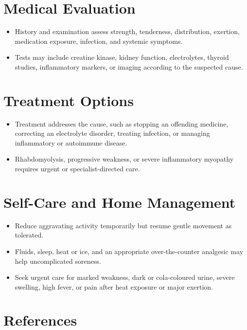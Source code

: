 \section*{Medical Evaluation}
\begin{itemize}
  \item History and examination assess strength, tenderness, distribution, exertion, medication exposure, infection, and systemic symptoms.
  \item Tests may include creatine kinase, kidney function, electrolytes, thyroid studies, inflammatory markers, or imaging according to the suspected cause.
\end{itemize}

\section*{Treatment Options}
\begin{itemize}
  \item Treatment addresses the cause, such as stopping an offending medicine, correcting an electrolyte disorder, treating infection, or managing inflammatory or autoimmune disease.
  \item Rhabdomyolysis, progressive weakness, or severe inflammatory myopathy requires urgent or specialist-directed care.
\end{itemize}

\section*{Self-Care and Home Management}
\begin{itemize}
  \item Reduce aggravating activity temporarily but resume gentle movement as tolerated.
  \item Fluids, sleep, heat or ice, and an appropriate over-the-counter analgesic may help uncomplicated soreness.
  \item Seek urgent care for marked weakness, dark or cola-coloured urine, severe swelling, high fever, or pain after heat exposure or major exertion.
\end{itemize}

\section*{References}

